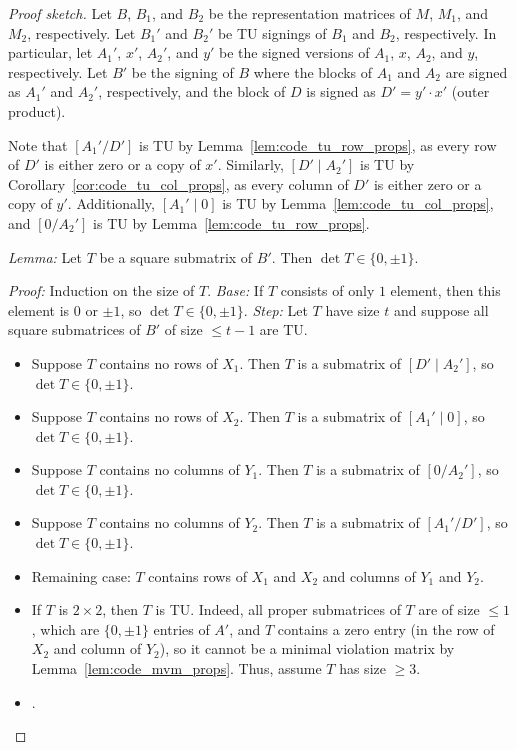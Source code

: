 \begin{proof}[Proof sketch]

  Let $B$, $B_{1}$, and $B_{2}$ be the representation matrices of $M$, $M_{1}$, and $M_{2}$, respectively.
  Let $B_{1}'$ and $B_{2}'$ be TU signings of $B_{1}$ and $B_{2}$, respectively.
  In particular, let $A_{1}'$, $x'$, $A_{2}'$, and $y'$ be the signed versions of $A_{1}$, $x$, $A_{2}$, and $y$, respectively.
  Let $B'$ be the signing of $B$ where the blocks of $A_{1}$ and $A_{2}$ are signed as $A_{1}'$ and $A_{2}'$, respectively, and the block of $D$ is signed as $D' = y' \cdot x'$ (outer product).

  Note that $\left[ A_{1}' / D' \right]$ is TU by Lemma~\ref{lem:code_tu_row_props}, as every row of $D'$ is either zero or a copy of $x'$.
  Similarly, $\left[D' \mid A_{2}' \right]$ is TU by Corollary~\ref{cor:code_tu_col_props}, as every column of $D'$ is either zero or a copy of $y'$.
  Additionally, $\left[ A_{1}' \mid 0 \right]$ is TU by Lemma~\ref{lem:code_tu_col_props}, and $\left[ 0 / A_{2}' \right]$ is TU by Lemma~\ref{lem:code_tu_row_props}.


  \emph{Lemma:} Let $T$ be a square submatrix of $B'$. Then $\det T \in \{0, \pm 1\}$.

  \emph{Proof:} Induction on the size of $T$.
  \emph{Base:} If $T$ consists of only $1$ element, then this element is $0$ or $\pm 1$, so $\det T \in \{0, \pm 1\}$.
  \emph{Step:} Let $T$ have size $t$ and suppose all square submatrices of $B'$ of size $\leq t - 1$ are TU.
  \begin{itemize}
    \item Suppose $T$ contains no rows of $X_{1}$. Then $T$ is a submatrix of $\left[D' \mid A_{2}' \right]$, so $\det T \in \{0, \pm 1\}$.
    \item Suppose $T$ contains no rows of $X_{2}$. Then $T$ is a submatrix of $\left[A_{1}' \mid 0 \right]$, so $\det T \in \{0, \pm 1\}$.
    \item Suppose $T$ contains no columns of $Y_{1}$. Then $T$ is a submatrix of $\left[0 / A_{2}' \right]$, so $\det T \in \{0, \pm 1\}$.
    \item Suppose $T$ contains no columns of $Y_{2}$. Then $T$ is a submatrix of $\left[ A_{1}' / D' \right]$, so $\det T \in \{0, \pm 1\}$.
    \item Remaining case: $T$ contains rows of $X_{1}$ and $X_{2}$ and columns of $Y_{1}$ and $Y_{2}$.
    \item If $T$ is $2 \times 2$, then $T$ is TU. Indeed, all proper submatrices of $T$ are of size $\leq 1$, which are $\{0, \pm 1\}$ entries of $A'$, and $T$ contains a zero entry (in the row of $X_{2}$ and column of $Y_{2}$), so it cannot be a minimal violation matrix by Lemma~\ref{lem:code_mvm_props}. Thus, assume $T$ has size $\geq 3$.
    \item .
  \end{itemize}
\end{proof}


